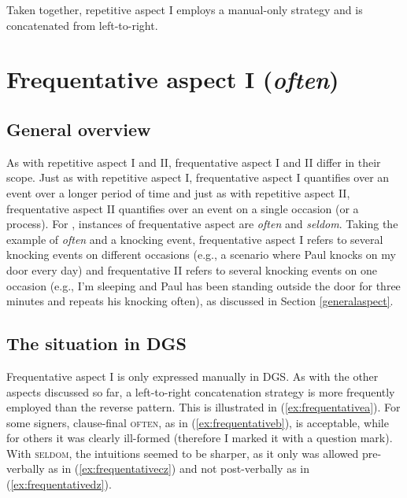 \noindent Taken together, repetitive aspect I employs a manual-only strategy and is concatenated from left-to-right. 


\section{Frequentative aspect I (\textit{often})}\label{frequentative}
\subsection{General overview}
As with repetitive aspect I and II, frequentative aspect I and II differ in their scope. Just as with repetitive aspect I, frequentative aspect I quantifies over an event over a longer period of time and just as with repetitive aspect II, frequentative aspect II quantifies over an event on a single occasion (or a process). For \citet{cinque1999adverbs}, instances of frequentative aspect are \textit{often} and \textit{seldom}. Taking the example of \textit{often} and a knocking event, frequentative aspect I refers to several knocking events on different occasions (e.g., a scenario where Paul knocks on my door every day) and frequentative II refers to several knocking events on one occasion (e.g., I'm sleeping and Paul has been standing outside the door for three minutes and repeats his knocking often), as discussed in Section \ref{generalaspect}.

\subsection{The situation in DGS}
Frequentative aspect I is only expressed manually in DGS. As with the other aspects discussed so far, a left-to-right concatenation strategy is more frequently employed than the reverse pattern. This is illustrated in (\ref{ex:frequentativea}). For some signers, clause-final \textsc{often}, as in (\ref{ex:frequentativeb}), is acceptable, while for others it was clearly ill-formed (therefore I marked it with a question mark). With \textsc{seldom}, the intuitions seemed to be sharper, as it only was allowed pre-verbally as in (\ref{ex:frequentativecz}) and not post-verbally as in (\ref{ex:frequentativedz}).


\begin{exe}
\ex\begin{xlist} 
\end{xlist}
\end{exe} 

